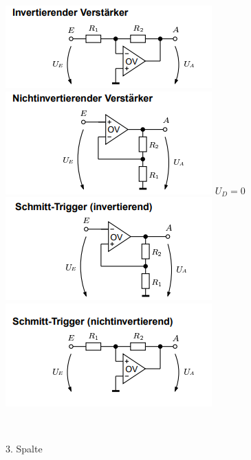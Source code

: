 \documentclass[11pt]{article}
\begin{document}
\begin{landscape}
\begin{minipage}{0.3\textwidth}
\includegraphics[scale=0.40]{IOV.png}
\includegraphics[scale=0.40]{NIOV.png}
$U_D = 0$
\includegraphics[scale=0.40]{ISTOV.png}
\includegraphics[scale=0.40]{NISTOV.png}

\end{minipage}%
~~~~~~
\begin{minipage}{0.3\textwidth}
3. Spalte
\end{minipage}%

\end{landscape}
\end{document}
